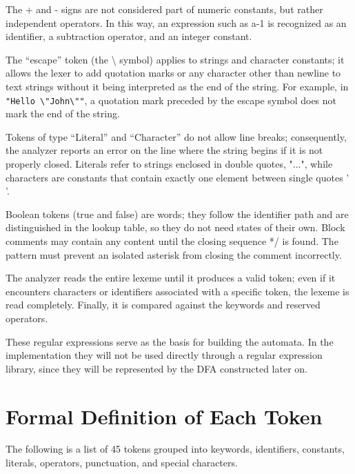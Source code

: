\documentclass[12pt,letterpaper]{article}
\begin{document}
The + and - signs are not considered part of numeric constants, but rather independent operators. In this way, an expression such as a-1 is recognized as an identifier, a subtraction operator, and an integer constant.

The ``escape'' token (the \textbackslash{} symbol) applies to strings and character constants; it allows the lexer to add quotation marks or any character other than newline to text strings without it being interpreted as the end of the string. For example, in \texttt{"Hello \textbackslash"John\textbackslash""}, a quotation mark preceded by the escape symbol does not mark the end of the string.

Tokens of type ``Literal'' and ``Character'' do not allow line breaks; consequently, the analyzer reports an error on the line where the string begins if it is not properly closed. Literals refer to strings enclosed in double quotes, "...", while characters are constants that contain exactly one element between single quotes ' '.

Boolean tokens (true and false) are words; they follow the identifier path and are distinguished in the lookup table, so they do not need states of their own. Block comments may contain any content until the closing sequence */ is found. The pattern must prevent an isolated asterisk from closing the comment incorrectly.

The analyzer reads the entire lexeme until it produces a valid token; even if it encounters characters or identifiers associated with a specific token, the lexeme is read completely. Finally, it is compared against the keywords and reserved operators.

These regular expressions serve as the basis for building the automata. In the implementation they will not be used directly through a regular expression library, since they will be represented by the DFA constructed later on.

\section{Formal Definition of Each Token}

The following is a list of 45 tokens grouped into keywords, identifiers, constants, literals, operators, punctuation, and special characters.
\end{document}
